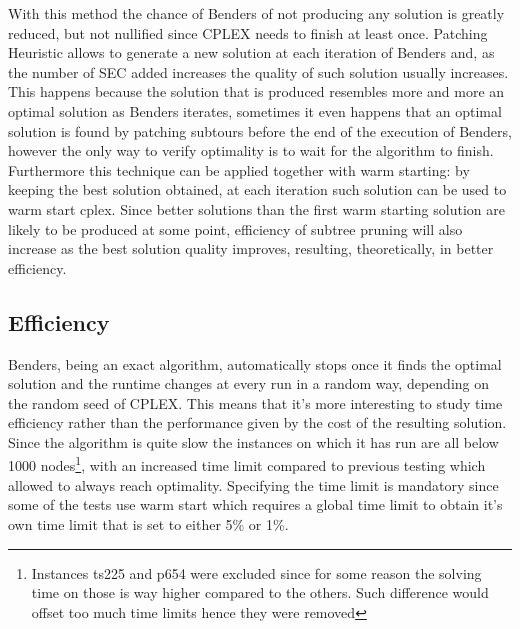 With this method the chance of Benders of not producing any solution is greatly reduced, but not nullified since CPLEX needs to finish at least once.
Patching Heuristic allows to generate a new solution at each iteration of Benders and, as the number of SEC added increases the quality of such solution usually increases.
This happens because the solution that is produced resembles more and more an optimal solution as Benders iterates, sometimes it even happens that an optimal solution is found by patching subtours before the end of the execution of Benders, however the only way to verify optimality is to wait for the algorithm to finish.
Furthermore this technique can be applied together with warm starting: by keeping the best solution obtained, at each iteration such solution can be used to warm start cplex.
Since better solutions than the first warm starting solution are likely to be produced at some point, efficiency of subtree pruning will also increase as the best solution quality improves, resulting, theoretically, in better efficiency.

\subsection{Efficiency}
Benders, being an exact algorithm, automatically stops once it finds the optimal solution and the runtime changes at every run in a random way, depending on the random seed of CPLEX. 
This means that it's more interesting to study time efficiency rather than the performance given by the cost of the resulting solution.
Since the algorithm is quite slow the instances on which it has run are all below 1000 nodes\footnote{Instances ts225 and p654 were excluded since for some reason the solving time on those is way higher compared to the others. Such difference would offset too much time limits hence they were removed}, with an increased time limit compared to previous testing which allowed to always reach optimality.
Specifying the time limit is mandatory since some of the tests use warm start which requires a global time limit to obtain it's own time limit that is set to either 5\% or 1\%.

